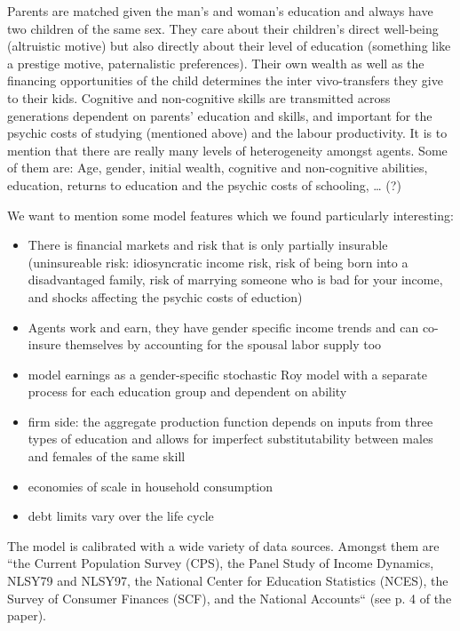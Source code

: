 \documentclass[12pt,a4paper,xcolor=dvipsnames]{article}
\begin{document}
Parents are matched given the man’s and woman’s education and always have two children of the same sex. They care about their children’s direct well-being (altruistic motive) but also directly about their level of education (something like a prestige motive, paternalistic preferences). Their own wealth as well as the financing opportunities of the child determines the inter vivo-transfers they give to their kids. Cognitive and non-cognitive skills are transmitted across generations dependent on parents’ education and skills, and important for the psychic costs of studying (mentioned above) and the labour productivity. 
It is to mention that there are really many levels of heterogeneity amongst agents. Some of them are: Age, gender, initial wealth, cognitive and non-cognitive abilities, education, returns to education and the psychic costs of schooling, … (?)

We want to mention some model features which we found particularly interesting:
\begin{itemize}
    \item There is financial markets and risk that is only partially insurable (uninsureable risk: idiosyncratic income risk, risk of being born into a disadvantaged family, risk of marrying someone who is bad for your income, and shocks affecting the psychic costs of eduction)
    \item Agents work and earn, they have gender specific income trends and can co-insure themselves by accounting for the spousal labor supply too
    \item model earnings as a gender-specific stochastic Roy model with a separate process for each education group and dependent on ability
    \item firm side: the aggregate production function depends on inputs from three types of education and allows for imperfect substitutability between males and females of the same skill
    \item economies of scale in household consumption
    \item debt limits vary over the life cycle
\end{itemize}

The model is calibrated with a wide variety of data sources. Amongst them are “the Current Population Survey (CPS), the Panel Study of Income Dynamics, NLSY79 and NLSY97, the National Center for Education Statistics (NCES), the Survey of Consumer Finances (SCF), and the National Accounts“ (see p. 4 of the paper). 
\end{document}
